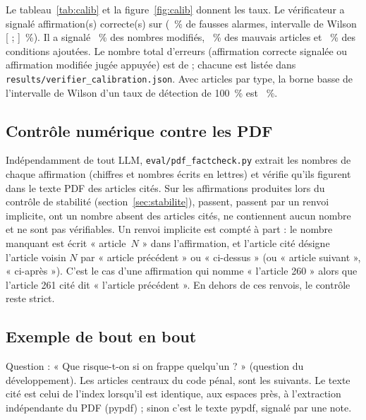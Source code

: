 Le tableau~\ref{tab:calib} et la figure~\ref{fig:calib} donnent les taux. Le vérificateur a signalé \NCalibGoodFlagged{}
affirmation(s) correcte(s) sur \NCalibN{} (\NCalibGoodRate~\% de fausses alarmes, intervalle de Wilson
[\NCalibGoodLo{} ; \NCalibGoodHi]~\%). Il a signalé \NCalibNumberRate~\% des nombres modifiés, \NCalibWrongRate~\% des
mauvais articles et \NCalibCondRate~\% des conditions ajoutées. Le nombre total d'erreurs (affirmation correcte signalée
ou affirmation modifiée jugée appuyée) est de \NCalibMisses{} ; chacune est listée dans
\texttt{results/verifier\_calibration.json}. Avec \NCalibN{} articles par type, la borne basse de l'intervalle de Wilson
d'un taux de détection de 100~\% est \NCalibWrongLo~\%.



\subsection{Contrôle numérique contre les PDF}
Indépendamment de tout LLM, \texttt{eval/pdf\_factcheck.py} extrait les nombres de chaque affirmation (chiffres et nombres
écrits en lettres) et vérifie qu'ils figurent dans le texte PDF des articles cités. Sur les \NFactcheckClaims{} affirmations
produites lors du contrôle de stabilité (section~\ref{sec:stabilite}), \NFactcheckOk{} passent, \NFactcheckImplicit{}
passent par un renvoi implicite, \NFactcheckMissing{} ont un nombre absent des articles cités, \NFactcheckNonum{} ne
contiennent aucun nombre et \NFactcheckUnverifiable{} ne sont pas vérifiables. Un renvoi implicite est compté à part : le
nombre manquant est écrit « article~$N$ » dans l'affirmation, et l'article cité désigne l'article voisin $N$ par « article
précédent » ou « ci-dessus » (ou « article suivant », « ci-après »). C'est le cas d'une affirmation qui nomme
« l'article 260 » alors que l'article 261 cité dit « l'article précédent ». En dehors de ces renvois, le contrôle reste
strict.

\subsection{Exemple de bout en bout}
Question : « Que risque-t-on si on frappe quelqu'un ? » (question du développement). Les articles centraux du code pénal,
sont les suivants. Le texte cité est celui de l'index lorsqu'il est identique, aux espaces près, à l'extraction
indépendante du PDF (pypdf) ; sinon c'est le texte pypdf, signalé par une note.

